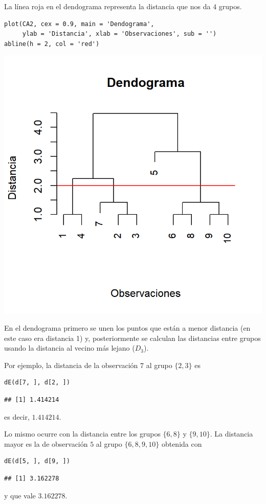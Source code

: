 La línea roja en el dendograma representa la distancia que nos da $4$ grupos.

\begin{lstlisting}
plot(CA2, cex = 0.9, main = 'Dendograma', 
     ylab = 'Distancia', xlab = 'Observaciones', sub = '')
abline(h = 2, col = 'red')
\end{lstlisting}
\begin{center}
\includegraphics[width=0.5\linewidth]{"Temas/Imágenes/Tema 6/screenshot010"}
\end{center}
En el dendograma primero se unen los puntos que están a menor distancia (en este caso era distancia 1) y, posteriormente se calculan las distancias entre grupos usando la distancia al vecino más lejano ($D_3$).

Por ejemplo, la distancia de la observación $7$ al grupo $\{2,3\}$ es
\begin{lstlisting}
dE(d[7, ], d[2, ])
\end{lstlisting}
\begin{verbatim}
## [1] 1.414214
\end{verbatim}
es decir, $1.414214$.

Lo mismo ocurre con la distancia entre los grupos $\{6,8\}$ y $\{9,10\}$. La distancia mayor es la de observación $5$ al grupo $\{6,8,9,10\}$ obtenida con 
\begin{lstlisting}
dE(d[5, ], d[9, ])
\end{lstlisting}
\begin{verbatim}
## [1] 3.162278
\end{verbatim}
y que vale $3.162278$.